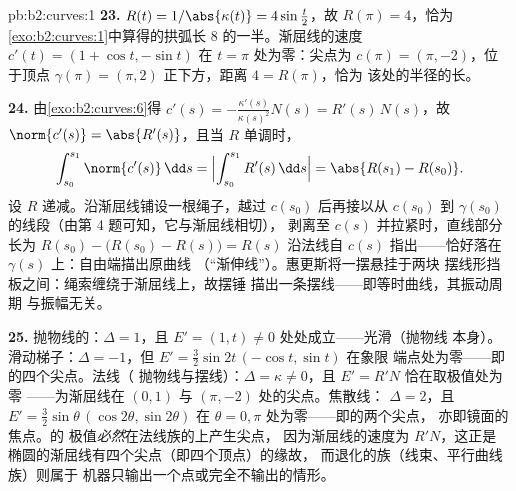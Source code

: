 \begin{solution}{pb:b2:curves:1}
\textbf{23.} $R(t) = 1/\abs{\kappa(t)} = 4\sin\tfrac t2$，故
$R(\pi) = 4$，恰为
\cref{exo:b2:curves:1}中算得的拱弧长 $8$ 的一半。渐屈线的速度 $c'(t) = (1 +
\cos t, -\sin t)$ 在 $t = \pi$ 处为零：尖点为 $c(\pi)
= (\pi, -2)$，位于顶点 $\gamma(\pi) = (\pi,
2)$ 正下方，距离 $4 = R(\pi)$，恰为
该处的半径的长。

\textbf{24.} 由\cref{exo:b2:curves:6}得 $c'(s) =
-\frac{\kappa'(s)}{\kappa(s)^2}N(s) = R'(s)\,N(s)$，故
$\norm{c'(s)} = \abs{R'(s)}$，且当 $R$ 单调时，
\[
\int_{s_0}^{s_1}\norm{c'(s)}\,\dd s =
\Bigl|\int_{s_0}^{s_1}R'(s)\,\dd s\Bigr| = \abs{R(s_1) -
R(s_0)} .
\]
设 $R$ 递减。沿渐屈线铺设一根绳子，越过
$c(s_0)$ 后再接以从 $c(s_0)$ 到
$\gamma(s_0)$ 的线段（由第 4 题可知，它与渐屈线相切），
剥离至 $c(s)$ 并拉紧时，直线部分
长为 $R(s_0) - \bigl(R(s_0) - R(s)\bigr) = R(s)$
沿法线自 $c(s)$ 指出——恰好落在
$\gamma(s)$ 上：自由端描出原曲线
（“渐伸线”）。惠更斯将一摆悬挂于两块
摆线形挡板之间：绳索缠绕于渐屈线上，故摆锤
描出一条摆线——即等时曲线，其振动周期
与振幅无关。

\textbf{25.} 抛物线的：$\Delta = 1$，且 $E' =
(1, t) \neq 0$ 处处成立——光滑（抛物线
本身）。滑动梯子：$\Delta = -1$，但 $E' =
\tfrac32\sin 2t\,(-\cos t, \sin t)$ 在象限
端点处为零——即的四个尖点。法线（
抛物线与摆线）：$\Delta = \kappa \neq 0$，且
$E' = R'N$ 恰在取极值处为零
——为渐屈线在 $(0,1)$ 与 $(\pi, -2)$ 处的尖点。焦散线：
$\Delta = 2$，且 $E' = \tfrac32\sin\theta\,(\cos2\theta,
\sin2\theta)$ 在 $\theta = 0, \pi$ 处为零——即的两个尖点，
亦即镜面的焦点。的
极值\emph{必然}在法线族的上产生尖点，
因为渐屈线的速度为 $R'N$，这正是
椭圆的渐屈线有四个尖点（即四个顶点）的缘故，
而退化的族（线束、平行曲线族）则属于
机器只输出一个点或完全不输出的情形。
\end{solution}
